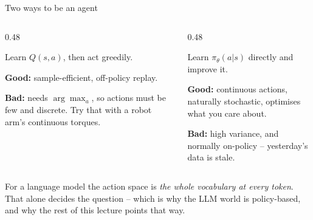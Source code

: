 \documentclass[aspectratio=169]{beamer}
\begin{document}
\begin{frame}{Two ways to be an agent}
  \begin{columns}[T]
    \begin{column}{0.48\textwidth}
      \begin{tcolorbox}[colback=armblue!8, colframe=armblue, boxrule=0.6pt, arc=2pt,
                        title=\textbf{Value-based}]
        \small
        Learn $Q(s,a)$, then act greedily.

        \vskip 4pt
        \textbf{Good:} sample-efficient, off-policy replay.

        \vskip 2pt
        \textbf{Bad:} needs $\arg\max_a$, so actions must be few and discrete. Try that with a
        robot arm's continuous torques.
      \end{tcolorbox}
    \end{column}
    \begin{column}{0.48\textwidth}
      \begin{tcolorbox}[colback=paramgreen!8, colframe=paramgreen, boxrule=0.6pt, arc=2pt,
                        title=\textbf{Policy-based}]
        \small
        Learn $\pi_\theta(a|s)$ directly and improve it.

        \vskip 4pt
        \textbf{Good:} continuous actions, naturally stochastic, optimises what you care about.

        \vskip 2pt
        \textbf{Bad:} high variance, and normally on-policy -- yesterday's data is stale.
      \end{tcolorbox}
    \end{column}
  \end{columns}

  \vskip 10pt
  \begin{tcolorbox}[colback=lightbg, colframe=popblue, boxrule=0.6pt, arc=2pt]
    \small
    For a language model the action space is \emph{the whole vocabulary at every token}. That
    alone decides the question -- which is why the LLM world is policy-based, and why the rest
    of this lecture points that way.
  \end{tcolorbox}
\end{frame}
\end{document}
